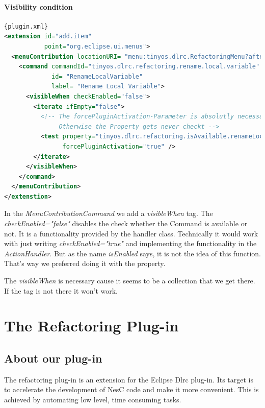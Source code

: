 \documentclass[a4paper,10pt]{report}
\begin{document}
\subsection{Visibility condition}


\begin{lstlisting}[language=XML,caption=Visibility condition ({\it plugin.xml})]{plugin.xml}
<extension id="add.item"
           point="org.eclipse.ui.menus">
  <menuContribution locationURI= "menu:tinyos.dlrc.RefactoringMenu?after=additions">
    <command commandId="tinyos.dlrc.refactoring.rename.local.variable"
             id= "RenameLocalVariable"
             label= "Rename Local Variable">
      <visibleWhen checkEnabled="false">
        <iterate ifEmpty="false">
          <!-- The forcePluginActivation-Parameter is absolutly necessary. 
               Otherwise the Property gets never checkt -->
          <test property="tinyos.dlrc.refactoring.isAvailable.renameLocalVariable"
                forcePluginActivation="true" />
        </iterate>
      </visibleWhen>
    </command>
  </menuContribution>
</extenstion>
\end{lstlisting}
In the {\it MenuContributionCommand} we add a {\it visibleWhen} tag.
The {\it checkEnabled="false"} disables the check whether the Command is available or not. 
It is a functionality provided by the handler class.
Technically it would work with just writing {\it checkEnabled="true"} and implementing the functionality in the {\it ActionHandler}.
But as the name {\it isEnabled} says, it is not the idea of this function.
That's way we preferred doing it with the property.

The {\it visibleWhen} is necessary cause it seems to be a collection that we get there. If the tag is not there it won't work.

\part{The Refactoring Plug-in}
\chapter{About our plug-in}
The refactoring plug-in is an extension for the Eclipse Dlrc plug-in.
Its target is to accelerate the development of NesC code and make it more convenient.
This is achieved by automating low level, time consuming tasks.
\end{document}
